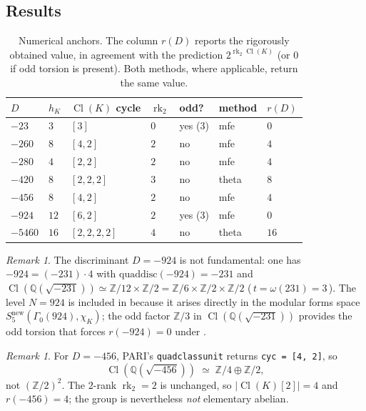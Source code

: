 \documentclass[11pt]{amsart}
\theoremstyle{definition}
\theoremstyle{remark}
\newtheorem{remark}[theorem]{Remark}
\DeclareMathOperator{\Cl}{Cl}
\DeclareMathOperator{\rk}{rk}
\newcommand{\Q}{\mathbb{Q}}
\newcommand{\Z}{\mathbb{Z}}
\newcommand{\chiK}{\chi_K}
\begin{document}
\subsection{Results}\label{sec:results-table}

\begin{table}[h]
\centering
\caption{Numerical anchors. The column \(r(D)\) reports the rigorously
obtained value, in agreement with the prediction
\(2^{\rk_2 \Cl(K)}\) (or \(0\) if odd torsion is present). Both methods,
where applicable, return the same value.}
\label{tab:anchors}
\begin{tabular}{lllllll}
\toprule
\(D\) & \(h_K\) & \(\Cl(K)\) cycle & \(\rk_2\) & odd? & method & \(r(D)\) \\
\midrule
\(-23\)    & \(3\)  & \([3]\)         & \(0\) & yes (3)    & mfe   & \(0\)  \\
\(-260\)   & \(8\)  & \([4,2]\)       & \(2\) & no         & mfe   & \(4\)  \\
\(-280\)   & \(4\)  & \([2,2]\)       & \(2\) & no         & mfe   & \(4\)  \\
\(-420\)   & \(8\)  & \([2,2,2]\)     & \(3\) & no         & theta & \(8\)  \\
\(-456\)   & \(8\)  & \([4,2]\)       & \(2\) & no         & mfe   & \(4\)  \\
\(-924\)   & \(12\) & \([6,2]\)       & \(2\) & yes (3)    & mfe   & \(0\)  \\
\(-5460\)  & \(16\) & \([2,2,2,2]\)   & \(4\) & no         & theta & \(16\) \\
\bottomrule
\end{tabular}
\end{table}

\begin{remark}\label{rem:924}
The discriminant \(D = -924\) is not fundamental: one has
\(-924 = (-231)\cdot 4\) with \(\mathrm{quaddisc}(-924) = -231\) and
\(\Cl(\Q(\sqrt{-231})) \simeq \Z/12 \times \Z/2 = \Z/6 \times \Z/2 \times \Z/2\)
(\,\(t = \omega(231) = 3\)\,). The level \(N = 924\) is included in
 because it arises directly in the modular forms
space \(S_5^{\mathrm{new}}(\Gamma_0(924), \chiK)\); the odd factor
\(\Z/3\) in \(\Cl(\Q(\sqrt{-231}))\) provides the odd torsion that
forces \(r(-924) = 0\) under .
\end{remark}

\begin{remark}\label{rem:456-cyc}
For \(D = -456\), PARI's \texttt{quadclassunit} returns
\texttt{cyc = [4, 2]}, so
\[
  \Cl(\Q(\sqrt{-456})) \;\simeq\; \Z/4 \oplus \Z/2,
\]
not \((\Z/2)^2\). The \(2\)-rank \(\rk_2 = 2\) is unchanged, so
\(|\Cl(K)[2]| = 4\) and \(r(-456) = 4\); the group is nevertheless
\emph{not} elementary abelian.
\end{remark}
\end{document}
